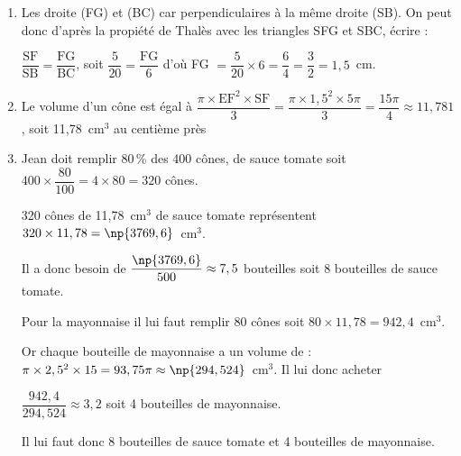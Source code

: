 \begin{enumerate}
\item %
Les droite (FG) et (BC) car perpendiculaires à la même droite (SB). On peut donc d'après la propiété de Thalès avec les triangles SFG et SBC, écrire :

$\dfrac{\text{SF}}{\text{SB}} = \dfrac{\text{FG}}{\text{BC}} $, soit $\dfrac{5}{20} = \dfrac{\text{FG}}{6}$ d'où FG $= \dfrac{5}{20} \times 6 = \dfrac{6}{4} = \dfrac{3}{2} = 1,5$~cm.
\item %
Le volume d'un cône est égal à $\dfrac{\pi \times \text{EF}^2 \times \text{SF}}{3} =  \dfrac{\pi \times 1,5^2 \times 5\pi}{3} = \dfrac{15\pi}{4} \approx 11,781$, soit 11,78~cm$^3$ au centième près 
\item %
Jean doit remplir 80\,\% des 400 cônes, de sauce tomate soit $400 \times \dfrac{80}{100} = 4 \times 80 = 320$ cônes.

320 cônes de 11,78~cm$^3$ de sauce tomate représentent $320 \times 11,78 = \np{3769,6}$~cm$^3$. 

Il a donc besoin de $\dfrac{\np{3769,6}}{500} \approx 7,5$ bouteilles soit 8 bouteilles de sauce tomate.

Pour la mayonnaise il lui faut remplir 80 cônes soit $80 \times 11,78 = 942,4$~cm$^3$.

Or chaque bouteille de mayonnaise a un volume de : $\pi \times 2,5^2 \times 15 = 93,75\pi \approx \np{294,524}$~cm$^3$. Il lui donc acheter 

$\dfrac{942,4}{294,524} \approx 3,2$ soit 4 bouteilles de mayonnaise.

Il lui faut donc 8 bouteilles de sauce tomate et 4 bouteilles de mayonnaise.
\end{enumerate}

\medskip

%
%




